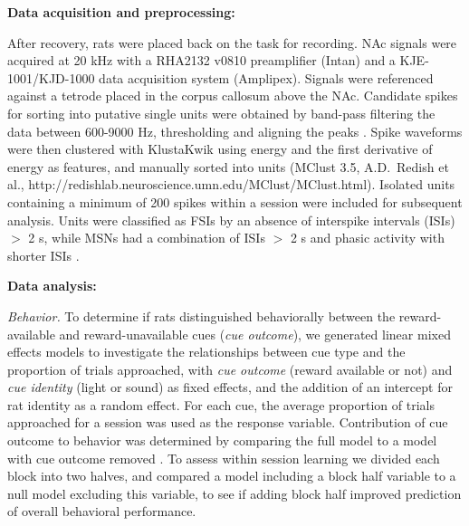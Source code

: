 \documentclass[11pt]{article}
\let\cite=\citep
\providecommand{\DIFadd}[1]{{\protect\color{red} \sf #1}} %
\providecommand{\DIFdel}[1]{} %
\providecommand{\DIFaddbegin}{} %
\providecommand{\DIFaddend}{} %
\providecommand{\DIFdelbegin}{} %
\providecommand{\DIFdelend}{} %
\newcommand{\DIFscaledelfig}{0.5}
\newlength{\DIFdelgraphicswidth} %
\newlength{\DIFdelgraphicsheight} %
\newcommand{\DIFaddincludegraphics}[2][]{{\color{red}\fbox{\DIFOincludegraphics[#1]{#2}}}} %
\newcommand{\DIFdelincludegraphics}[2][]{%
\sbox{\DIFdelgraphicsbox}{\DIFOincludegraphics[#1]{#2}}%
\settoboxwidth{\DIFdelgraphicswidth}{\DIFdelgraphicsbox} %
\settoboxtotalheight{\DIFdelgraphicsheight}{\DIFdelgraphicsbox} %
\scalebox{\DIFscaledelfig}{%
\parbox[b]{\DIFdelgraphicswidth}{\usebox{\DIFdelgraphicsbox}\\[-\baselineskip] \rule{\DIFdelgraphicswidth}{0em}}\llap{\resizebox{\DIFdelgraphicswidth}{\DIFdelgraphicsheight}{%
\setlength{\unitlength}{\DIFdelgraphicswidth}%
\begin{picture}(1,1)%
\thicklines\linethickness{2pt} %
{\color[rgb]{1,0,0}\put(0,0){\framebox(1,1){}}}%
{\color[rgb]{1,0,0}\put(0,0){\line( 1,1){1}}}%
{\color[rgb]{1,0,0}\put(0,1){\line(1,-1){1}}}%
\end{picture}%
}\hspace*{3pt}}} %
} %
\DeclareRobustCommand{\DIFaddbegin}{\DIFOaddbegin \let\includegraphics\DIFaddincludegraphics} %
\DeclareRobustCommand{\DIFaddend}{\DIFOaddend \let\includegraphics\DIFOincludegraphics} %
\DeclareRobustCommand{\DIFdelbegin}{\DIFOdelbegin \let\includegraphics\DIFdelincludegraphics} %
\DeclareRobustCommand{\DIFdelend}{\DIFOaddend \let\includegraphics\DIFOincludegraphics} %
\begin{document}
{\bf Data acquisition and preprocessing:}

After recovery, rats were placed back on the task for recording. NAc
signals were acquired at 20 kHz with a RHA2132 v0810 preamplifier
(Intan) and a KJE-1001/KJD-1000 data acquisition system
(Amplipex). Signals were referenced against a tetrode placed in the
corpus callosum above the NAc. Candidate spikes for sorting into
putative single units were obtained by band-pass filtering the data
between 600-9000 Hz, thresholding and aligning the peaks \cite[UltraMegaSort2k, ][]{Hill2011}. Spike waveforms were then
clustered with KlustaKwik using energy and the first derivative of
energy as features, and manually sorted into units (MClust 3.5,
A.D.\ Redish et al., http://redishlab.neuroscience.umn.edu/MClust/MClust.html). Isolated units containing a minimum of 200
spikes within a session were included for subsequent analysis. Units
were classified as \DIFdelbegin \DIFdel{fast spiking interneurons (FSIs ) }\DIFdelend \DIFaddbegin \DIFadd{FSIs }\DIFaddend by an absence of
interspike intervals (ISIs) $>$ 2 s, while \DIFdelbegin \DIFdel{medium spiny neurons (MSNs
)
}\DIFdelend \DIFaddbegin \DIFadd{MSNs
}\DIFaddend had a combination of ISIs $>$ 2 s and phasic activity with shorter
ISIs \cite{Barnes2005,Atallah2014}.

{\bf Data analysis:}

{\it Behavior.} To determine if rats distinguished behaviorally
between the reward-available and reward-unavailable cues ({\it cue
outcome}), we generated linear mixed effects models to investigate
the relationships between cue type and \DIFdelbegin \DIFdel{our behavioral variables}\DIFdelend \DIFaddbegin \DIFadd{the proportion of trials approached}\DIFaddend , with
{\it cue outcome} (reward available or not) and {\it cue identity}
(light or sound) as fixed effects, and the addition of an intercept
for rat identity as a random effect. For each cue, the average
proportion of trials approached \DIFdelbegin \DIFdel{and trial length }\DIFdelend for a session \DIFdelbegin \DIFdel{were
used as response variables}\DIFdelend \DIFaddbegin \DIFadd{was
used as the response variable}\DIFaddend . Contribution of cue outcome to behavior
was determined by comparing the full model to a model with cue outcome
removed\DIFdelbegin \DIFdel{for each behavioral variable }\DIFdelend \DIFaddbegin \DIFadd{. To assess within session learning we divided each block into two halves, and compared a model including a block half variable to a null model excluding this variable, to see if adding block half improved prediction of overall behavioral performance}\DIFaddend .
\end{document}
